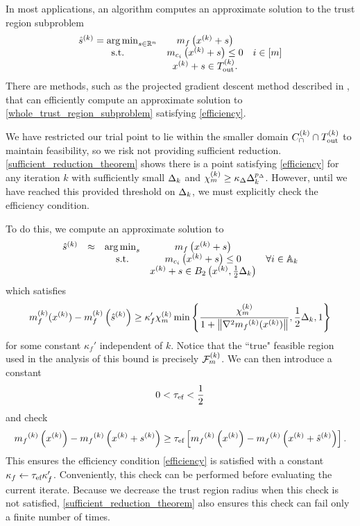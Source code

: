 In most applications, an algorithm computes an approximate solution to the trust region subproblem
\begin{align}
\label{whole_trust_region_subproblem}
\begin{array}{ccc}
{{\hat s}^{(k)}} = \operatorname*{arg\,min}_{s \in \mathbb R^n} & m_{f}\left(x^{(k)} + s\right) & \\
\textrm{s.t.} & m_{c_i}\left(x^{(k)} + s\right) \le 0 & i \in [m]\\
& x^{(k)} + s \in {T_{\text{out}}^{(k)}}. & \\
\end{array}
\end{align}
There are methods, such as the projected gradient descent method described in \cite[Section 12.2.1]{Conn:2000:TM:357813},
that can efficiently compute an approximate solution to \cref{whole_trust_region_subproblem} satisfying \cref{efficiency}.

We have restricted our trial point to lie within the smaller domain ${C^{(k)}_{\cap}} \cap {T_{\text{out}}^{(k)}}$ to maintain feasibility,
so we risk not providing sufficient reduction.
\cref{sufficient_reduction_theorem} shows there is a point satisfying \cref{efficiency} 
for any iteration $k$ with sufficiently small $\Delta_k$ and ${\chi_m^{(k)}} \ge \kappa_{\Delta}\Delta_k^{p_{\Delta}}$.
However, until we have reached this provided threshold on $\Delta_k$, we must explicitly check the efficiency condition.

To do this, we compute an approximate solution to
\begin{align}
\label{half_tr_subproblem}
\begin{array}{ccccc}
{{\hat s}^{(k)}} &\approx& \operatorname*{arg\,min}_{s} & m_f\left(x^{(k)} + s\right) & \\
&& \textrm{s.t.} & m_{c_i}\left(x^{(k)} + s\right) \le 0 & \forall i \in {\mathbb A_{k}} \\
&&&x^{(k)} + s \in B_2\left(x^{(k)}, \frac 1 2 \Delta_k\right) &
\end{array}
\end{align}
which satisfies
\begin{align}
\label{what_ugc_satisfies}
m_f^{(k)}(x^{(k)}) - m_f^{(k)}\left({{\hat s}^{(k)}} \right) \ge \kappa_f' {\chi_m^{(k)}} \min\left\{ \frac{{\chi_m^{(k)}}}{1+\left\|\nabla^2 {{m}_f}^{(k)}(x^{(k)})\right\|}, \frac 1 2 \Delta_k, 1 \right\}
\end{align}
for some constant $\kappa_f'$ independent of $k$.
Notice that the ``true" feasible region used in the analysis of this bound is precisely ${\mathcal F_m^{(k)}}$.
We can then introduce a constant
\begin{align}
0 < {\tau_{\textrm{ef}}} < \frac 1 2
\end{align}
and check 
\begin{align}
{{m}_f}^{(k)}\left(x^{(k)}\right) - {{m}_f}^{(k)}\left(x^{(k)} + {{s}^{(k)}}\right) \ge {\tau_{\textrm{ef}}} \left[{{m}_f}^{(k)}\left(x^{(k)}\right) - {{m}_f}^{(k)}\left(x^{(k)} + {{\hat s}^{(k)}}\right)\right]. \label{expected_reduction_check}
\end{align}
This ensures the efficiency condition \cref{efficiency} is satisfied with a constant $\kappa_f \gets {\tau_{\textrm{ef}}} \kappa_{f}'$.
Conveniently, this check can be performed before evaluating the current iterate.
Because we decrease the trust region radius when this check is not satisfied,
\cref{sufficient_reduction_theorem} also ensures this check can fail only a finite number of times.

